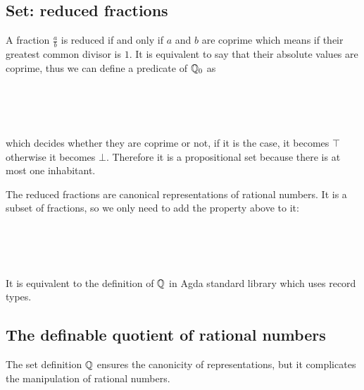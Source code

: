 \subsection{Set: reduced fractions}

A fraction $\frac{a}{b}$ is reduced if and only if $a$ and $b$ are coprime which means if their greatest common divisor is $1$. It is equivalent to say that their absolute values are coprime, thus we can define a predicate of $\mathbb{Q}_0$ as

\begin{code}\>\<%
\\
\> \AgdaSymbol{:}   \<%
\\
\> \AgdaSymbol{(}  \AgdaSymbol{)} \AgdaSymbol{=}  \AgdaSymbol{(}    \AgdaSymbol{(} \AgdaSymbol{))}\<%
\\
\>\<\end{code}

which decides whether they are coprime or not, if it is the case, it becomes $\top$ otherwise it becomes $\bot$. Therefore it is a propositional set because there is at most one inhabitant.

The reduced fractions are canonical representations of rational
numbers. It is a subset of fractions, so we only need to add the property above to it:

\begin{code}\>\<%
\\
\> \AgdaSymbol{:} \<%
\\
\> \AgdaSymbol{=} \AgdaRecord{Σ[}    \AgdaRecord{]}  \<%
\\
\>\<\end{code}


It is equivalent to the definition of $\mathbb{Q}$ in Agda standard library which uses record types.


\subsection{The definable quotient of rational numbers}

The set definition $\mathbb{Q}$ ensures the canonicity of representations, but it complicates the manipulation
of rational numbers.

